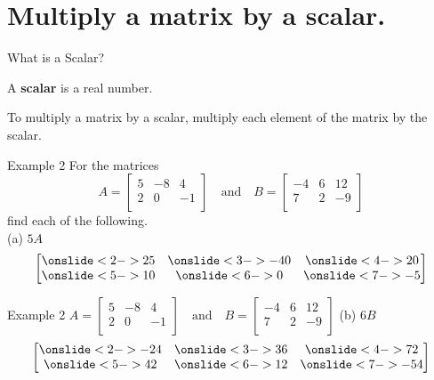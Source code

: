 \documentclass[t]{beamer}
\begin{document}
\section{Multiply a matrix by a scalar.}

\begin{frame}{What is a Scalar?}
\begin{tcolorbox}[colback=red!20!white, colframe=red!30!black, title=\textbf{Scalar}]
A \textbf{scalar} is a real number.
\end{tcolorbox}
\vspace{10pt} \pause

To multiply a matrix by a scalar, multiply each element of the matrix by the scalar.
\end{frame}

\begin{frame}{Example 2}
For the matrices
\[
A =
\begin{bmatrix}
5   &   -8  &   4   \\
2   &   0   &   -1  \\
\end{bmatrix}
\quad \text{and} \quad
B = 
\begin{bmatrix}
-4  &   6   &   12  \\
7   &   2   &   -9  \\
\end{bmatrix}
\]
find each of the following.	\newline\\
(a) \quad $5A$
\[
\begin{bmatrix}
\onslide<2->{25} & \onslide<3->{-40} & \onslide<4->{20} \\
\onslide<5->{10} & \onslide<6->{0} & \onslide<7->{-5} \\
\end{bmatrix}
\]
\end{frame}

\begin{frame}{Example 2 \quad $A =
\begin{bmatrix}
5   &   -8  &   4   \\
2   &   0   &   -1  \\
\end{bmatrix}
\quad \text{and} \quad
B = 
\begin{bmatrix}
-4  &   6   &   12  \\
7   &   2   &   -9  \\
\end{bmatrix}$}
(b) \quad $6B$
\[
\begin{bmatrix}
\onslide<2->{-24} & \onslide<3->{36} & \onslide<4->{72} \\
\onslide<5->{42} & \onslide<6->{12} & \onslide<7->{-54} \\
\end{bmatrix}
\]
\end{frame}
\end{document}
